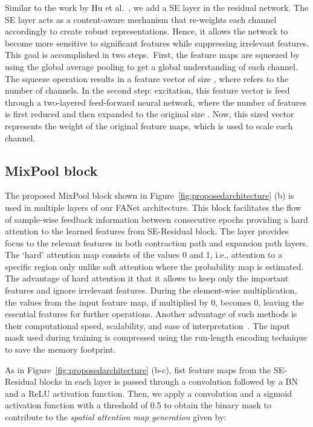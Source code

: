 \documentclass[journal]{IEEEtran}
\begin{document}
Similar to the work by Hu et al.~\cite{Hu_2018_CVPR}, we add a \ac{SE} layer in the residual network. The \ac{SE} layer acts as a content-aware mechanism that re-weights each channel accordingly to create robust representations. Hence, it allows the network to become more sensitive to significant features while suppressing irrelevant features. This goal is accomplished in two steps.~First, the feature maps are squeezed by using the global average pooling to get a global understanding of each channel. The squeeze operation results in a  feature vector of size , where  refers to the number of channels. In the second step: excitation, this feature vector is feed through a two-layered feed-forward neural network, where the number of features is first reduced and then expanded to the original size . Now, this  sized vector represents the weight of the original feature maps, which is used to scale each channel.

\subsection{MixPool block}
The proposed MixPool block shown in Figure~\ref{fig:proposedarchitecture} (b) is used in multiple layers of our FANet architecture. This block facilitates the flow of sample-wise feedback information between consecutive epochs providing a hard attention to the learned features from SE-Residual block. The layer provides focus to the relevant features in both contraction path and expansion path layers.  The ‘hard’ attention map consists of the values 0 and 1, i.e., attention to a specific region only unlike soft attention where the probability map is estimated. The advantage of hard attention it that it allows to keep only the important features and ignore irrelevant features. During the element-wise multiplication, the values from the input feature map, if multiplied by 0, becomes 0, leaving the essential features for further operations. Another advantage of such methods is their computational speed, scalability, and ease of interpretation~\cite{xu2015show,malinowski2018learning}. The input mask used during training is compressed using the run-length encoding technique to save the memory footprint. 

As in Figure~\ref{fig:proposedarchitecture} (b-c), fist feature maps from the SE-Residual blocks  in each layer is passed through a  convolution followed by a \ac{BN} and a \ac{ReLU} activation function. Then, we apply a  convolution and a sigmoid activation function  with a threshold of 0.5 to obtain the binary mask  to contribute to the \textit{spatial attention map generation} given by:
\end{document}
